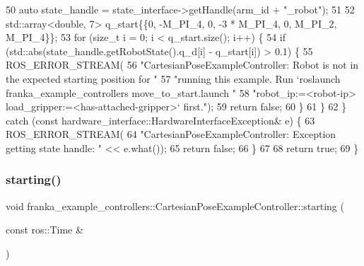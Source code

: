 \begin{DoxyCode}
50     \textcolor{keyword}{auto} state\_handle = state\_interface->getHandle(arm\_id + \textcolor{stringliteral}{"\_robot"});
51 
52     std::array<double, 7> q\_start\{\{0, -M\_PI\_4, 0, -3 * M\_PI\_4, 0, M\_PI\_2, M\_PI\_4\}\};
53     \textcolor{keywordflow}{for} (\textcolor{keywordtype}{size\_t} i = 0; i < q\_start.size(); i++) \{
54       \textcolor{keywordflow}{if} (std::abs(state\_handle.getRobotState().q\_d[i] - q\_start[i]) > 0.1) \{
55         ROS\_ERROR\_STREAM(
56             \textcolor{stringliteral}{"CartesianPoseExampleController: Robot is not in the expected starting position for "}
57             \textcolor{stringliteral}{"running this example. Run `roslaunch franka\_example\_controllers move\_to\_start.launch "}
58             \textcolor{stringliteral}{"robot\_ip:=<robot-ip> load\_gripper:=<has-attached-gripper>` first."});
59         \textcolor{keywordflow}{return} \textcolor{keyword}{false};
60       \}
61     \}
62   \} \textcolor{keywordflow}{catch} (\textcolor{keyword}{const} hardware\_interface::HardwareInterfaceException& e) \{
63     ROS\_ERROR\_STREAM(
64         \textcolor{stringliteral}{"CartesianPoseExampleController: Exception getting state handle: "} << e.what());
65     \textcolor{keywordflow}{return} \textcolor{keyword}{false};
66   \}
67 
68   \textcolor{keywordflow}{return} \textcolor{keyword}{true};
69 \}
\end{DoxyCode}
\mbox{\label{classfranka__example__controllers_1_1CartesianPoseExampleController_a80a14c57df1285078330b8d70bd7308b}} 
\subsubsection{\texorpdfstring{starting()}{starting()}}
{\footnotesize\ttfamily void franka\+\_\+example\+\_\+controllers\+::\+Cartesian\+Pose\+Example\+Controller\+::starting (\begin{DoxyParamCaption}\item[{const ros\+::\+Time \&}]{ }\end{DoxyParamCaption})\hspace{0.3cm}{\ttfamily [override]}}



